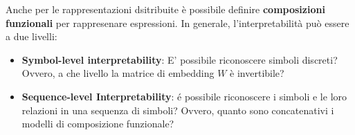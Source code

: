 Anche per le rappresentazioni dsitribuite è possibile definire \textbf{composizioni funzionali} per rappresenare espressioni. In generale, l'interpretabilità può essere a due livelli:
\begin{itemize}
    \item \textbf{Symbol-level interpretability}: E' possibile riconoscere simboli discreti? Ovvero, a che livello la matrice di embedding $W$ è invertibile?
    \item \textbf{Sequence-level Interpretability}: é possibile riconoscere i simboli e le loro relazioni in una sequenza di simboli? Ovvero, quanto sono concatenativi i modelli di composizione funzionale?
\end{itemize}
